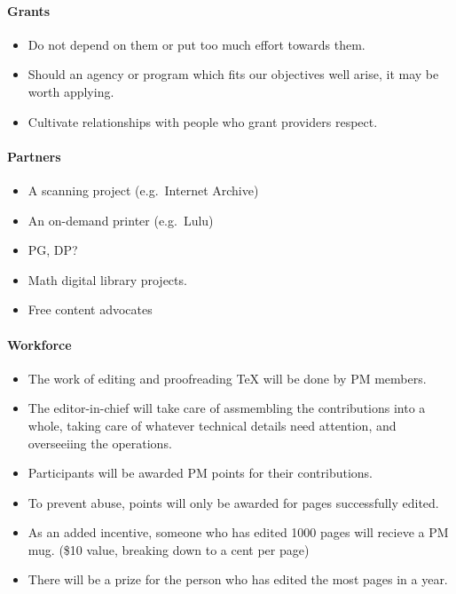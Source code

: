 \begin{itemize}
\begin{itemize}
\paragraph{Grants}

\begin{itemize}
\item
  Do not depend on them or put too much effort towards them.
\item
  Should an agency or program which fits our objectives well arise, it
  may be worth applying.
\item
  Cultivate relationships with people who grant providers respect.
\end{itemize}

\paragraph{Partners}

\begin{itemize}
\item
  A scanning project (e.g.~Internet Archive)
\item
  An on-demand printer (e.g.~Lulu)
\item
  PG, DP?
\item
  Math digital library projects.
\item
  Free content advocates
\end{itemize}

\paragraph{Workforce}

\begin{itemize}
\item
  The work of editing and proofreading TeX will be done by PM members.
\item
  The editor-in-chief will take care of assmembling the contributions
  into a whole, taking care of whatever technical details need
  attention, and overseeiing the operations.
\item
  Participants will be awarded PM points for their contributions.
\item
  To prevent abuse, points will only be awarded for pages successfully
  edited.
\item
  As an added incentive, someone who has edited 1000 pages will recieve
  a PM mug. (\$10 value, breaking down to a cent per page)
\item
  There will be a prize for the person who has edited the most pages in
  a year.
\end{itemize}


\end{itemize}
\end{itemize}
